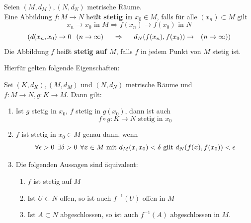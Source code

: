 \begin{definition} 
	Seien $(M, d_{M}), (N, d_{N})$ metrische Räume. \\
	Eine Abbildung $f: M \rightarrow N$ hei{\ss}t \textbf{stetig in $x_{0} \in M$}, falls für alle $(x_{n}) \subset M$ gilt
	\[ x_{n} \rightarrow x_{0} \text{ in } M \Rightarrow f(x_{n}) \rightarrow f(x_{0}) \text{ in } N \]
	\[ (d(x_{n}, x_{0}) \rightarrow 0 \hspace{0.25cm} (n \rightarrow \infty) \hspace{0.5cm} \Rightarrow \hspace{0.5cm} d_{N}(f(x_{n}), f(x_{0})) \rightarrow \hspace{0.25cm} (n \rightarrow \infty)) \]
	Die Abbildung $f$ hei{\ss}t \textbf{stetig auf $M$}, falls $f$ in jedem Punkt von $M$ stetig ist.
\end{definition}

Hierfür gelten folgende Eigenschaften:

\begin{prop}
	Sei $(K,d_{K}), (M, d_{M})$ und $(N, d_{N})$ metrische Räume und $f: M \rightarrow N, g: K \rightarrow M$. Dann gilt:
	\begin{enumerate}[label=\alph*\upshape)]
		\item Ist $g$ stetig in $x_{0}$, $f$ stetig in $g(x_{0})$, dann ist auch 
			\[ f \circ g: K \rightarrow N \text{ stetig in } x_{0} \]
		\item $f$ ist stetig in $x_{0} \in M$ genau dann, wenn 
			\[ \forall \epsilon > 0 \hspace{0.15cm} \exists \delta > 0 \hspace{0.15cm} \forall x \in M \text{ mit } d_{M}(x, x_{0}) < \delta \text{ gilt } d_{N}(f(x), f(x_{0})) < \epsilon \]
		\item Die folgenden Aussagen sind äquivalent:
			\begin{enumerate}
				\item $f$ ist stetig auf $M$
				\item Ist $U \subset N$ offen, so ist auch $f^{-1}(U)$ offen in $M$
				\item Ist $A \subset N$ abgeschlossen, so ist auch $f^{-1}(A)$ abgeschlossen in $M$.
			\end{enumerate}
	\end{enumerate}	
	\begin{beweis}
	\end{beweis}
\end{prop}

